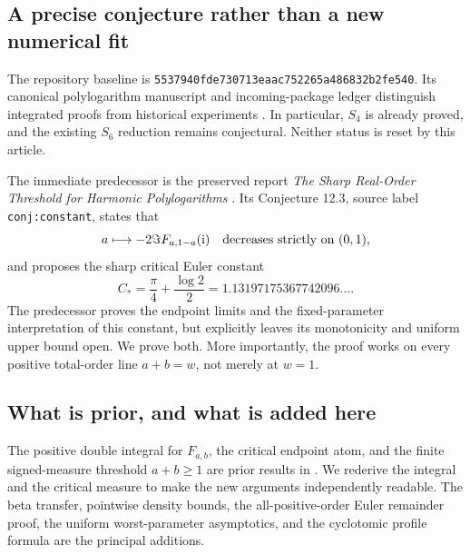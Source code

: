 \documentclass[11pt]{article}
\numberwithin{equation}{section}
\theoremstyle{definition}\newtheorem{definition}[theorem]{Definition}
\theoremstyle{remark}\newtheorem{remark}[theorem]{Remark}
\newcommand{\ii}{\mathrm i}
\newcommand{\CC}{C_*}
\newcommand{\pin}{\nolinkurl{5537940fde730713eaac752265a486832b2fe540}}
\begin{document}
\subsection{A precise conjecture rather than a new numerical fit}
The repository baseline is \pin. Its canonical polylogarithm manuscript
and incoming-package ledger distinguish integrated proofs from historical
experiments \cite{repo}. In particular, $S_4$ is already proved, and the
existing $S_6$ reduction remains conjectural. Neither status is reset by
this article.

The immediate predecessor is the preserved report \emph{The Sharp
Real-Order Threshold for Harmonic Polylogarithms} \cite{threshold}. Its
Conjecture 12.3, source label \texttt{conj:constant}, states that
\begin{equation}\label{eq:oldconj}
 a\longmapsto-2\Im F_{a,1-a}(\ii)
 \quad\hbox{decreases strictly on }(0,1),
\end{equation}
and proposes the sharp critical Euler constant
\begin{equation}\label{eq:Cstar}
 \CC=\frac\pi4+\frac{\log2}{2}
 =1.13197175367742096\ldots.
\end{equation}
The predecessor proves the endpoint limits and the fixed-parameter
interpretation of this constant, but explicitly leaves its monotonicity
and uniform upper bound open. We prove both. More importantly, the proof
works on every positive total-order line $a+b=w$, not merely at $w=1$.

\subsection{What is prior, and what is added here}
The positive double integral for $F_{a,b}$, the critical endpoint atom,
and the finite signed-measure threshold $a+b\ge1$ are prior results in
\cite{threshold}. We rederive the integral and the critical measure to
make the new arguments independently readable. The beta transfer,
pointwise density bounds, the all-positive-order Euler remainder proof,
the uniform worst-parameter asymptotics, and the cyclotomic profile
formula are the principal additions.
\end{document}
